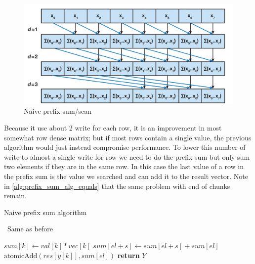 \documentclass[conference]{IEEEtran}
\begin{document}
\begin{figure}[h!]
	\centering
	\includegraphics[width=0.9\linewidth]{other_img/naive-scan}
	\caption{Naive prefix-sum/scan}
	\label{fig:naive-scan}
\end{figure}
\FloatBarrier
Because it use about 2 write for each row, it is an improvement in most somewhat row dense matrix; but if most rows contain a single value, the previous algorithm would just instead compromise performance. To lower this number of write to almost a single write for row we need to do the prefix sum but only sum two elements if they are in the same row. In this case the last value of a row in the prefix sum is the value we searched and can add it to the result vector. Note in \ref{alg:prefix_sum_alg_equals} that the same problem with end of chunks remain.

\begin{algorithm}[h!]
	\caption{Naive prefix sum algorithm}
	\algorithmicrequire~Same as before
	\begin{algorithmic}[1]
			\State {}
			\State $sum[k] \leftarrow  val[k] * vec[k]$
			\State {}
					\State $sum[el + s]  \leftarrow sum[el + s] + sum[el]$
				\EndIf
			\EndFor
			\State {}
				\State $\text{atomicAdd}(res[y[k]], sum[el])$
			\EndIf
		\EndFor
		\State \textbf{return} $Y$
		\EndProcedure
	\end{algorithmic}
	\label{alg:prefix_sum_alg_equals}
\end{algorithm}
\end{document}
